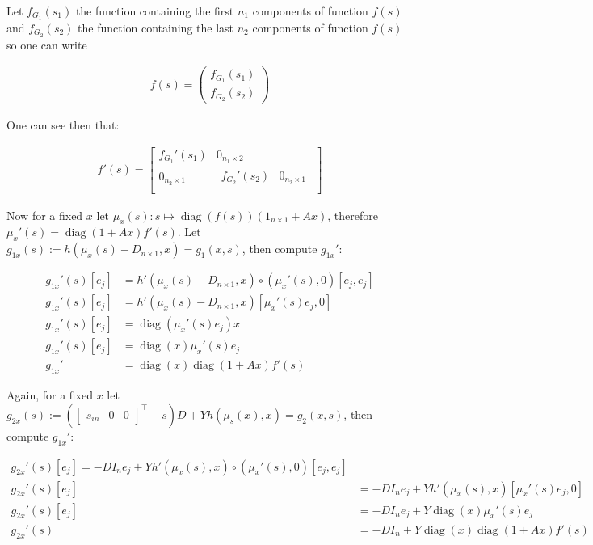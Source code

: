 \documentclass[3p,times]{article}
\DeclareMathOperator{\diag}{diag}
\begin{document}
Let $f_{G_1}(s_1)$ the function containing the first $n_1$ components of function $f(s)$ and $f_{G_2}(s_2)$ the function containing the last $n_2$ components of function $f(s)$ so one can write 

\begin{align}
f(s) = \begin{pmatrix}
f_{G_1}(s_1) \\
f_{G_2}(s_2)
\end{pmatrix}
\end{align}

One can see then that:

\begin{align}
f'(s)= \begin{bmatrix}
f_{G_1}'(s_1) & 0_{n_1\times 2} \\
0_{n_2\times 1} & \begin{matrix} f_{G_2}'(s_2) & 0_{n_2\times 1} \end{matrix}  \\ 
\end{bmatrix}
\end{align}
 
Now for a fixed $x$ let $\mu_x(s): s \mapsto   \diag(f(s))(1_{n\times 1}+Ax)$, therefore $\mu_x'(s) =\diag(1+Ax)f'(s)$. Let $g_{1x}(s):= h(\mu_x(s) - D_{n\times 1},x)=g_1(x,s)$, then compute $g_{1x}'$:

\begin{align} 
g_{1x}'(s)[e_j]&=h'(\mu_x(s) - D_{n\times 1},x) \circ (\mu_x'(s),0)[e_j, e_j]\\
g_{1x}'(s)[e_j]&=h'(\mu_x(s) - D_{n\times 1},x) [\mu_x'(s)e_j, 0]\\
g_{1x}'(s)[e_j]&=\diag(\mu_x'(s)e_j)x \\
g_{1x}'(s)[e_j]&=\diag(x)\mu_x'(s)e_j \\
g_{1x}' &= \diag(x)\diag(1+Ax)f'(s)
\end{align}

Again, for a fixed $x$ let $g_{2x}(s):= \left(\begin{bmatrix} s_{in}&0&0 \end{bmatrix}^\top-s\right)D + Yh(\mu_s(x),x)=g_2(x,s)$, then compute $g_{1x}'$:

\begin{align}
g_{2x}'(s)[e_j] = -DI_ne_j + Y h'(\mu_x(s),x)\circ (\mu_x'(s),0)[e_j,e_j] \\
g_{2x}'(s)[e_j] &= -DI_ne_j + Y h'(\mu_x(s),x)[\mu_x'(s)e_j, 0] \\
g_{2x}'(s)[e_j] &= -DI_ne_j + Y \diag(x)\mu_x'(s)e_j \\
g_{2x}'(s) &= -DI_n+ Y \diag(x)\diag(1+Ax)f'(s)
\end{align} 
\end{document}
